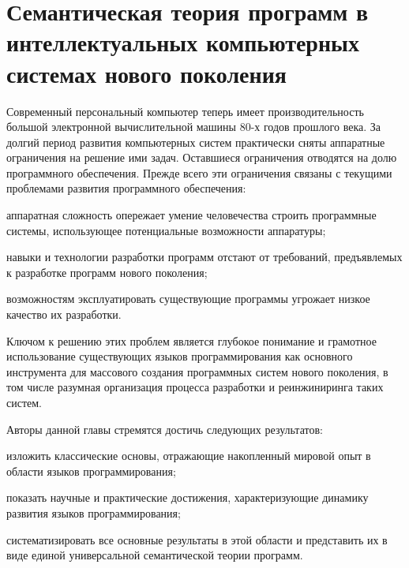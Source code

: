 \chapter{Семантическая теория программ в интеллектуальных компьютерных системах нового поколения}
\label{chapter_programs}

\abstract{}

Современный персональный компьютер теперь имеет производительность большой электронной вычислительной машины 80-х годов
прошлого века. За долгий период развития компьютерных систем практически сняты аппаратные ограничения на решение ими
задач. Оставшиеся ограничения отводятся на долю программного обеспечения.
Прежде всего эти ограничения связаны с текущими проблемами развития программного обеспечения:
\begin{scnitemize}
    \item аппаратная сложность опережает умение человечества строить программные системы, использующее потенциальные
    возможности аппаратуры;
    \item навыки и технологии разработки программ отстают от требований, предъявлемых к разработке программ нового
    поколения;
    \item возможностям эксплуатировать существующие программы угрожает низкое качество их разработки.
\end{scnitemize}
Ключом к решению этих проблем является глубокое понимание и грамотное использование существующих языков программирования 
как основного инструмента для массового создания программных систем нового поколения, в том числе разумная организация 
процесса разработки и реинжиниринга таких систем.

Авторы данной главы стремятся достичь следующих результатов:
\begin{scnitemize}
    \item изложить классические основы, отражающие накопленный мировой опыт в области языков программирования;
    \item показать научные и практические достижения, характеризующие динамику развития языков программирования;
    \item систематизировать все основные результаты в этой области и представить их в виде единой универсальной
    семантической теории программ.
\end{scnitemize}

